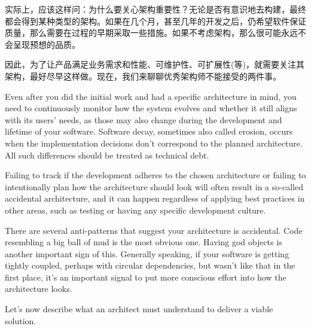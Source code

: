 
实际上，应该这样问：为什么要关心架构重要性？无论是否有意识地去构建，最终都会得到某种类型的架构。如果在几个月，甚至几年的开发之后，仍希望软件保证质量，那么需要在过程的早期采取一些措施。如果不考虑架构，那么很可能永远不会呈现预想的品质。

因此，为了让产品满足业务需求和性能、可维护性、可扩展性(等)，就需要关注其架构，最好尽早这样做。现在，我们来聊聊优秀架构师不能接受的两件事。


Even after you did the initial work and had a specific architecture in mind, you need to continuously monitor how the system evolves and whether it still aligns with its users' needs, as those may also change during the development and lifetime of your software. Software decay, sometimes also called erosion, occurs when the implementation decisions don't correspond to the planned architecture. All such differences should be treated as technical debt.


Failing to track if the development adheres to the chosen architecture or failing to intentionally plan how the architecture should look will often result in a so-called accidental architecture, and it can happen regardless of applying best practices in other areas, such as testing or having any specific development culture. 

There are several anti-patterns that suggest your architecture is accidental. Code resembling a big ball of mud is the most obvious one. Having god objects is another important sign of this. Generally speaking, if your software is getting tightly coupled, perhaps with circular dependencies, but wasn't like that in the first place, it's an important signal to put more conscious effort into how the architecture looks.

Let's now describe what an architect must understand to deliver a viable solution.











